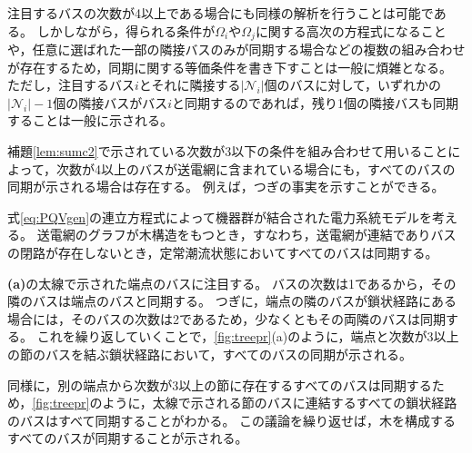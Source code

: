 \documentclass[tombow,dvipdfmx]{corona-a5-1.1}
\begin{document}
注目するバスの次数が4以上である場合にも同様の解析を行うことは可能である。
しかしながら，得られる条件が$\Omega_i$や$\Omega_j$に関する高次の方程式になることや，任意に選ばれた一部の隣接バスのみが同期する場合などの複数の組み合わせが存在するため，同期に関する等価条件を書き下すことは一般に煩雑となる。
ただし，注目するバス$i$とそれに隣接する$|\mathcal{N}_i|$個のバスに対して，いずれかの$|\mathcal{N}_i |-1$個の隣接バスがバス$i$と同期するのであれば，残り1個の隣接バスも同期することは一般に示される。

補題\ref{lem:sumc2}で示されている次数が3以下の条件を組み合わせて用いることによって，次数が4以上のバスが送電網に含まれている場合にも，すべてのバスの同期が示される場合は存在する。
例えば，つぎの事実を示すことができる。

\begin{定理}[木構造の送電網におけるバスの同期]
\label{thm:tree}
式\ref{eq:PQVgen}の連立方程式によって機器群が結合された電力系統モデルを考える。
送電網のグラフが木構造をもつとき，すなわち，送電網が連結でありバスの閉路が存在しないとき，定常潮流状態においてすべてのバスは同期する。
\end{定理}

\begin{証明}
\textbf{(a)}の太線で示された端点のバスに注目する。
バスの次数は1であるから，その隣のバスは端点のバスと同期する。
つぎに，端点の隣のバスが鎖状経路にある場合には，そのバスの次数は2であるため，少なくともその両隣のバスは同期する。
これを繰り返していくことで，\ref{fig:treepr}(a)のように，端点と次数が3以上の節のバスを結ぶ鎖状経路において，すべてのバスの同期が示される。

同様に，別の端点から次数が3以上の節に存在するすべてのバスは同期するため，\ref{fig:treepr}のように，太線で示される節のバスに連結するすべての鎖状経路のバスはすべて同期することがわかる。
この議論を繰り返せば，木を構成するすべてのバスが同期することが示される。
\end{証明}
\end{document}
